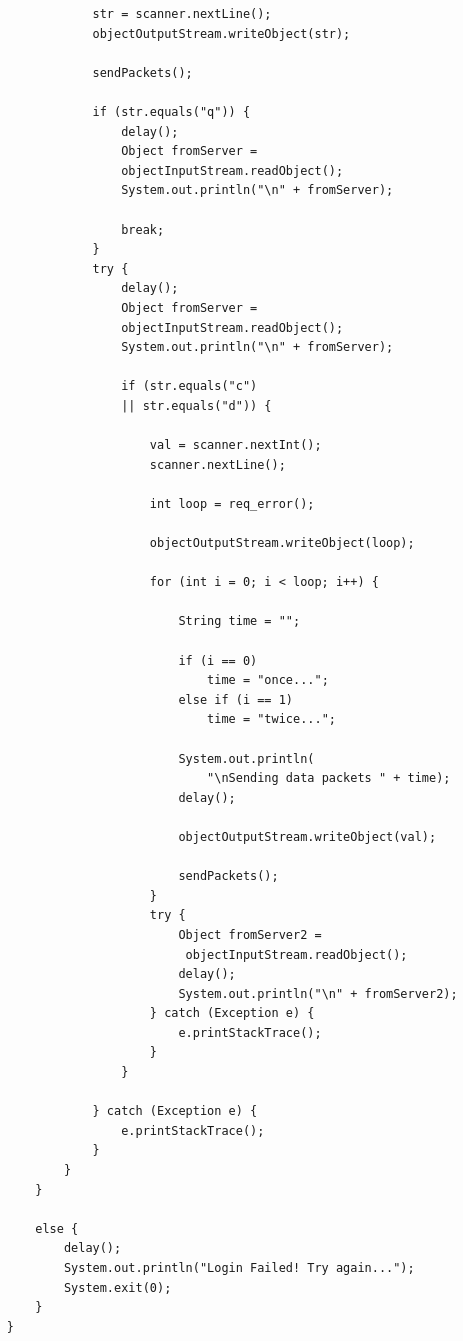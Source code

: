 \documentclass[11pt]{article}
\begin{document}
\begin{verbatim}
                str = scanner.nextLine();
                objectOutputStream.writeObject(str);

                sendPackets();

                if (str.equals("q")) {
                    delay();
                    Object fromServer = 
                    objectInputStream.readObject();
                    System.out.println("\n" + fromServer);

                    break;
                }
                try {
                    delay();
                    Object fromServer = 
                    objectInputStream.readObject();
                    System.out.println("\n" + fromServer);

                    if (str.equals("c") 
                    || str.equals("d")) {

                        val = scanner.nextInt();
                        scanner.nextLine();

                        int loop = req_error();

                        objectOutputStream.writeObject(loop);

                        for (int i = 0; i < loop; i++) {

                            String time = "";

                            if (i == 0)
                                time = "once...";
                            else if (i == 1)
                                time = "twice...";

                            System.out.println(
                                "\nSending data packets " + time);
                            delay();

                            objectOutputStream.writeObject(val);

                            sendPackets();
                        }
                        try {
                            Object fromServer2 =
                             objectInputStream.readObject();
                            delay();
                            System.out.println("\n" + fromServer2);
                        } catch (Exception e) {
                            e.printStackTrace();
                        }
                    }

                } catch (Exception e) {
                    e.printStackTrace();
                }
            }
        }

        else {
            delay();
            System.out.println("Login Failed! Try again...");
            System.exit(0);
        }
    }


\end{verbatim}
\end{document}
